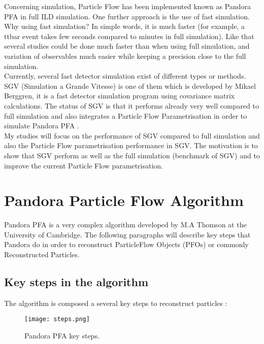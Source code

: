 \documentclass[a4paper,12pt]{article}
\begin{document}
Concerning simulation, Particle Flow has been implemented known as Pandora PFA in full ILD simulation. One further approach is the use of fast simulation. Why using fast simulation? In simple words, it is much faster (for example, a ttbar event takes few seconds compared to minutes in full simulation). Like that several studies could be done much faster than when using full simulation, and variation of observables much easier while keeping a precision close to the full simulation. \\

Currently, several fast detector simulation exist of different types or methods. SGV (Simulation a Grande Vitesse) is one of them which is developed by Mikael Berggren, it is a fast detector simulation program using covariance matrix calculations. The status of SGV is that it performs already very well compared to full simulation and also integrates a Particle Flow Parametrisation in order to simulate Pandora PFA \cite{Berggren}.\\

My studies will focus on the performance of SGV compared to full simulation and also the Particle Flow parametrisation performance in SGV. The motivation is to show that SGV perform as well as the full simulation (benchmark of SGV) and to improve the current Particle Flow parametrisation. 

\section{Pandora Particle Flow Algorithm}

Pandora PFA is a very complex algorithm developed by M.A Thomson at the University of Cambridge. The following paragraphs will describe key steps that Pandora do in order to reconstruct ParticleFlow Objects (PFOs) or commonly Reconstructed Particles. 

\subsection{Key steps in the algorithm}

The algorithm is composed a several key steps to reconstruct particles \cite{Pandora}:

\begin{figure}[H]
\centering
   \texttt{[image: steps.png]} 
      \caption{Pandora PFA key steps.}
   \label{fig:pflow_step}
\end{figure}
\end{document}
